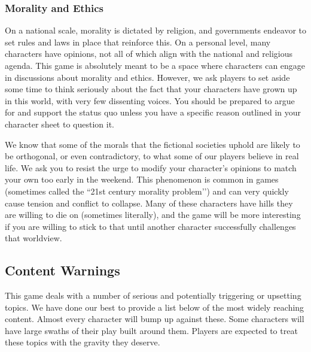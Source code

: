 \documentclass[sheet]{GL2020}
\begin{document}
\subsubsection{Morality and Ethics}
On a national scale, morality is dictated by religion, and governments endeavor to set rules and laws in place that reinforce this. On a personal level, many characters have opinions, not all of which align with the national and religious agenda. This game is absolutely meant to be a space where characters can engage in discussions about morality and ethics. However, we ask players to set aside some time to think seriously about the fact that your characters have grown up in this world, with very few dissenting voices. You should be prepared to argue for and support the status quo unless you have a specific reason outlined in your character sheet to question it.

We know that some of the morals that the fictional societies uphold are likely to be orthogonal, or even contradictory, to what some of our players believe in real life. We ask you to resist the urge to modify your character's opinions to match your own too early in the weekend. This phenomenon is common in games (sometimes called the ``21st century morality problem'’) and can very quickly cause tension and conflict to collapse. Many of these characters have hills they are willing to die on (sometimes literally), and the game will be more interesting if you are willing to stick to that until another character successfully challenges that worldview. 

\subsection{Content Warnings}
This game deals with a number of serious and potentially triggering or upsetting topics. We have done our best to provide a list below of the most widely reaching content. Almost every character will bump up against these. Some characters will have large swaths of their play built around them. Players are expected to treat these topics with the gravity they deserve.
\end{document}
